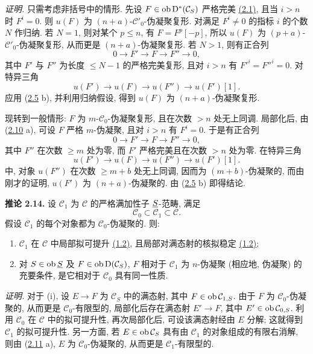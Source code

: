 \emph{证明.} 只需考虑非括号中的情形. 先设 \(F\in\operatorname{ob}\mathrm D^*(\mathcal C_S)\) 严格完美 \hyperlink{sga6.e01.def.2-1}{(2.1)}, 且当 \(i>n\) 时 \(F^i=0\). 则 \(u(F)\) 为 \((n+a)\)-\(\mathcal C'_0\)-伪凝聚复形. 对满足 \(F^i\neq0\) 的指标 \(i\) 的个数 \(N\) 作归纳. 若 \(N=1\), 则对某个 \(p\leq n\), 有 \(F=F^p[-p]\), 所以 \(u(F)\) 为 \((p+a)\)-\(\mathcal C'_0\)-伪凝聚复形, 从而更是 \((n+a)\)-伪凝聚复形. 若 \(N>1\), 则有正合列
\[
  0\longrightarrow F'\longrightarrow F\longrightarrow F''\longrightarrow 0,
\]
其中 \(F'\) 与 \(F''\) 为长度 \(\leq N-1\) 的严格完美复形, 且对 \(i>n\) 有 \(F'^i=F''^i=0\). 对特异三角
\[
  u(F')\longrightarrow u(F)\longrightarrow u(F'')\longrightarrow u(F')[1].
\]
应用 (\hyperlink{sga6.e01.prop.2-5}{2.5} b), 并利用归纳假设, 得到 \(u(F)\) 为 \((n+a)\)-伪凝聚复形.

现转到一般情形: \(F\) 为 \(m\)-\(\mathcal C_0\)-伪凝聚复形, 且在次数 \(>n\) 处无上同调. 局部化后, 由 (\hyperlink{sga6.e01.prop.2-10}{2.10} a), 可设 \(F\) 严格 \(m\)-伪凝聚, 且对 \(i>n\) 有 \(F^i=0\). 于是有正合列
\[
  0\longrightarrow F'\longrightarrow F\longrightarrow F''\longrightarrow 0,
\]
其中 \(F''\) 在次数 \(\geq m\) 处为零, 而 \(F'\) 严格完美且在次数 \(>n\) 处为零. 在特异三角
\[
  u(F')\longrightarrow u(F)\longrightarrow u(F'')\longrightarrow u(F')[1].
\]
中, 对象 \(u(F'')\) 在次数 \(\geq m+b\) 处无上同调, 因而为 \((m+b)\)-伪凝聚的, 而由刚才的证明, \(u(F')\) 为 \((n+a)\)-伪凝聚的. 由 (\hyperlink{sga6.e01.prop.2-5}{2.5} b) 即得结论.

\textbf{推论 2.14.} 设 \(\mathcal C_1\) 为 \(\mathcal C\) 的严格满加性子 \(\underline S\)-范畴, 满足
\[
  \mathcal C_0\subset \mathcal C_1\subset \mathcal C.
\]
假设 \(\mathcal C_1\) 的每个对象都为 \(\mathcal C_0\)-伪凝聚的. 则:

\begin{enumerate}[label=(\roman*)]
\item \(\mathcal C_1\) 在 \(\mathcal C\) 中局部拟可提升 \hyperlink{sga6.e01.sec.1.2}{(1.2)}, 且局部对满态射的核拟稳定 \hyperlink{sga6.e01.sec.1.2}{(1.2)};
\item 对 \(S\in\operatorname{ob}\underline S\) 及 \(F\in\operatorname{ob}\mathrm D(\mathcal C_S)\), \(F\) 相对于 \(\mathcal C_1\) 为 \(n\)-伪凝聚 (相应地, 伪凝聚) 的充要条件, 是它相对于 \(\mathcal C_0\) 具有同一性质.
\end{enumerate}

\emph{证明.} 对于 (i), 设 \(E\to F\) 为 \(\mathcal C_S\) 中的满态射, 其中 \(F\in\operatorname{ob}\mathcal C_{1,S}\). 由于 \(F\) 为 \(\mathcal C_0\)-伪凝聚的, 从而更是 \(\mathcal C_0\)-有限型的, 局部化后存在满态射 \(E'\to F\), 其中 \(E'\in\operatorname{ob}\mathcal C_{0,S}\). 利用 \(\mathcal C_0\) 在 \(\mathcal C\) 中的拟可提升性, 再次局部化后, 可设该满态射经由 \(E\) 分解; 这就得到 \(\mathcal C_1\) 的拟可提升性. 另一方面, 若 \(E\in\operatorname{ob}\mathcal C_S\) 具有由 \(\mathcal C_1\) 的对象组成的有限右消解, 则由 (\hyperlink{sga6.e01.prop.2-11}{2.11} a), \(E\) 为 \(\mathcal C_0\)-伪凝聚的, 从而更是 \(\mathcal C_1\)-有限型的.

